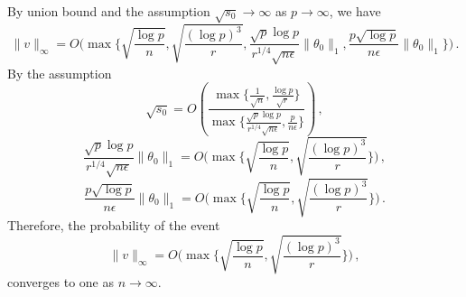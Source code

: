 \documentclass[11pt]{article}
\begin{document}
    By union bound and the assumption $\sqrt{s_0}\to \infty$ as $p \to \infty$, we have 
    \begin{equation*}
        \|v\|_\infty = O\bigg(\max\bigg\{\sqrt{\frac{\log p}{n}},\sqrt{\frac{(\log p )^3}{r}} , \frac{\sqrt{p}\log p}{r^{1/4}\sqrt{n\epsilon}}\|\theta_0\|_1 , \frac{p\sqrt{\log p}}{n\epsilon}\|\theta_0\|_1\bigg\}\bigg)\,.
    \end{equation*}
    By the assumption 
    \[
    \sqrt{s_0} = O\left(\frac{\max\big\{\frac{1}{\sqrt{n}},\frac{\log p }{\sqrt{r}}\big\}}{\max\big\{\frac{\sqrt{p}\log p}{r^{1/4}\sqrt{n\epsilon}},\frac{p}{n\epsilon}\big\}}\right)\,,
    \] 
    \begin{equation*}
        \frac{\sqrt{p}\log p}{r^{1/4}\sqrt{n\epsilon}}\|\theta_0\|_1 =O\bigg(\max\bigg\{\sqrt{\frac{\log p}{n}},\sqrt{\frac{(\log p )^3}{r}}\bigg\}\bigg)\,,
    \end{equation*}
    \begin{equation*}
        \frac{p\sqrt{\log p}}{n\epsilon}\|\theta_0\|_1=O\bigg(\max\bigg\{\sqrt{\frac{\log p}{n}},\sqrt{\frac{(\log p )^3}{r}}\bigg\}\bigg)\,.
    \end{equation*}
    Therefore, the probability of the event
    \[\|v\|_\infty=O\bigg(\max\bigg\{\sqrt{\frac{\log p}{n}},\sqrt{\frac{(\log p)^3}{r}}\bigg\}\bigg)\,,\]
    converges to one as $n\to\infty$.


\end{document}
